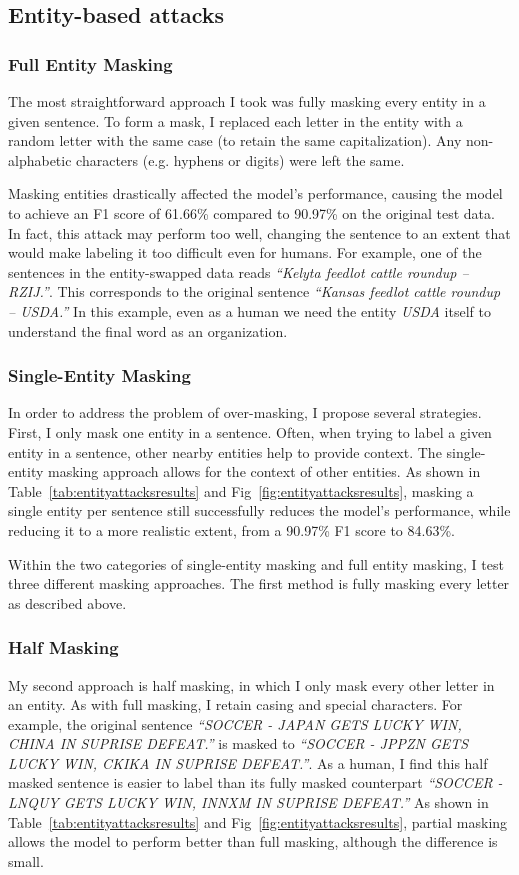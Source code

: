 \subsection{Entity-based attacks}
\subsubsection{Full Entity Masking}
The most straightforward approach I took was fully masking every entity in a given sentence. To form a mask, I replaced each letter in the entity with a random letter with the same case (to retain the same capitalization). Any non-alphabetic characters (e.g. hyphens or digits) were left the same. 

Masking entities drastically affected the model's performance, causing the model to achieve an F1 score of 61.66\% compared to 90.97\% on the original test data. In fact, this attack may perform too well, changing the sentence to an extent that would make labeling it too difficult even for humans. For example, one of the sentences in the entity-swapped data reads \textit{``Kelyta feedlot cattle roundup -- RZIJ.''}. This corresponds to the original sentence \textit{``Kansas feedlot cattle roundup -- USDA.''} In this example, even as a human we need the entity \textit{USDA} itself to understand the final word as an organization.

\subsubsection{Single-Entity Masking}
In order to address the problem of over-masking, I propose several strategies. First, I only mask one entity in a sentence. Often, when trying to label a given entity in a sentence, other nearby entities help to provide context. The single-entity masking approach allows for the context of other entities. As shown in Table~\ref{tab:entityattacksresults} and Fig~\ref{fig:entityattacksresults}, masking a single entity per sentence still successfully reduces the model's performance, while reducing it to a more realistic extent, from a 90.97\% F1 score to 84.63\%.

Within the two categories of single-entity masking and full entity masking, I test three different masking approaches. The first method is fully masking every letter as described above.

\subsubsection{Half Masking}
 My second approach is half masking, in which I only mask every other letter in an entity. As with full masking, I retain casing and special characters. For example, the original sentence \textit{``SOCCER - JAPAN GETS LUCKY WIN, CHINA IN SUPRISE DEFEAT.''} is masked to \textit{``SOCCER - JPPZN GETS LUCKY WIN, CKIKA IN SUPRISE DEFEAT.''}. As a human, I find this half masked sentence is easier to label than its fully masked counterpart \textit{``SOCCER - LNQUY GETS LUCKY WIN, INNXM IN SUPRISE DEFEAT.''} As shown in Table~\ref{tab:entityattacksresults} and Fig~\ref{fig:entityattacksresults}, partial masking allows the model to perform better than full masking, although the difference is small.
 
